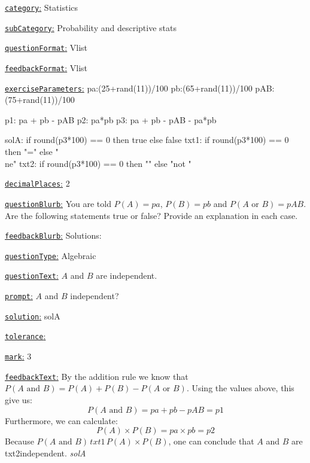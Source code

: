 \documentclass[preview]{standalone}
\newcommand \fieldname[1]{\underline{\texttt{#1}:}}
\begin{document}
\fieldname{category}  %
Statistics

\fieldname{subCategory} %
Probability and descriptive stats

\fieldname{questionFormat}
Vlist

\fieldname{feedbackFormat}
Vlist

\fieldname{exerciseParameters}
pa:(25+rand(11))/100
pb:(65+rand(11))/100
pAB:(75+rand(11))/100

p1: pa + pb - pAB
p2: pa*pb
p3: pa + pb - pAB - pa*pb


solA: if round(p3*100) == 0 then true else false
txt1: if round(p3*100) == 0 then "=" else "\\ne"
txt2: if round(p3*100) == 0 then "" else "not "

\fieldname{decimalPlaces}
2

\fieldname{questionBlurb}
You are told $P(A) = {pa}$, $P(B) = {pb}$ and $P(A \textrm{ or } B) = {pAB}$. Are the following statements true or false? Provide an explanation in each case.

\fieldname{feedbackBlurb}
Solutions:

\fieldname{questionType}
Algebraic

\fieldname{questionText}
$A$ and $B$ are independent.

\fieldname{prompt}
$A$ and $B$ independent?

\fieldname{solution}
solA

\fieldname{tolerance}


\fieldname{mark}
3

\fieldname{feedbackText}
By the addition rule we know that $P(A \textrm{ and } B) = P(A) + P(B) - P(A \textrm{ or } B)$. Using the values above, this give us:
\[
P(A \textrm{ and } B) = {pa} + {pb} - {pAB} = {p1}
\]
Furthermore, we can calculate:
\[
P(A)\times P(B) = {pa} \times {pb} = {p2}
\]
Because $P(A \textrm{ and } B) \, {txt1} \, P(A)\times P(B)$, one can conclude that $A$ and $B$ are {txt2}independent. \emph{{solA}}
\end{document}
